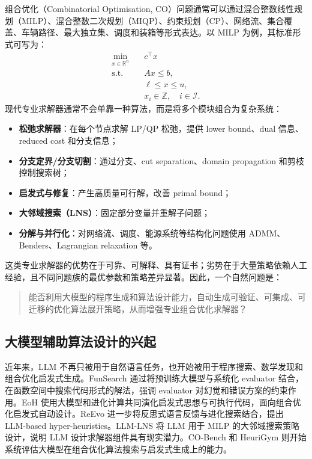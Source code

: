 \documentclass[UTF8,a4paper,12pt,fontset=fandol]{ctexart}
\begin{document}
组合优化（Combinatorial Optimisation, CO）问题通常可以通过混合整数线性规划（MILP）、混合整数二次规划（MIQP）、约束规划（CP）、网络流、集合覆盖、车辆路径、最大独立集、调度和装箱等形式表达。以 MILP 为例，其标准形式可写为：
\begin{equation}
\begin{aligned}
\min_{x \in \mathbb{R}^{n}} \quad & c^\top x \\
\text{s.t.} \quad & A x \le b,\\
& \ell \le x \le u,\\
& x_i \in \mathbb{Z}, \quad i \in \mathcal{I}.
\end{aligned}
\end{equation}
现代专业求解器通常不会单靠一种算法，而是将多个模块组合为复杂系统：
\begin{itemize}[leftmargin=2em]
    \item \textbf{松弛求解器}：在每个节点求解 LP/QP 松弛，提供 lower bound、dual 信息、reduced cost 和分支信息；
    \item \textbf{分支定界/分支切割}：通过分支、cut separation、domain propagation 和剪枝控制搜索树；
    \item \textbf{启发式与修复}：产生高质量可行解，改善 primal bound；
    \item \textbf{大邻域搜索（LNS）}：固定部分变量并重解子问题；
    \item \textbf{分解与并行化}：对网络流、调度、能源系统等结构化问题使用 ADMM、Benders、Lagrangian relaxation 等。
\end{itemize}

这类专业求解器的优势在于可靠、可解释、具有证书；劣势在于大量策略依赖人工经验，且不同问题族的最优参数和策略差异显著。因此，一个自然问题是：

\begin{quote}
能否利用大模型的程序生成和算法设计能力，自动生成可验证、可集成、可迁移的优化算法展开策略，从而增强专业组合优化求解器？
\end{quote}

\subsection{大模型辅助算法设计的兴起}

近年来，LLM 不再只被用于自然语言任务，也开始被用于程序搜索、数学发现和组合优化启发式生成。FunSearch 通过将预训练大模型与系统化 evaluator 结合，在函数空间中搜索代码形式的解法，强调 evaluator 对幻觉和错误方案的约束作用。EoH 使用大模型和进化计算共同演化启发式思想与可执行代码，面向组合优化启发式自动设计。ReEvo 进一步将反思式语言反馈与进化搜索结合，提出 LLM-based hyper-heuristics。LLM-LNS 将 LLM 用于 MILP 的大邻域搜索策略设计，说明 LLM 设计求解器组件具有现实潜力。CO-Bench 和 HeuriGym 则开始系统评估大模型在组合优化算法搜索与启发式生成上的能力。
\end{document}

